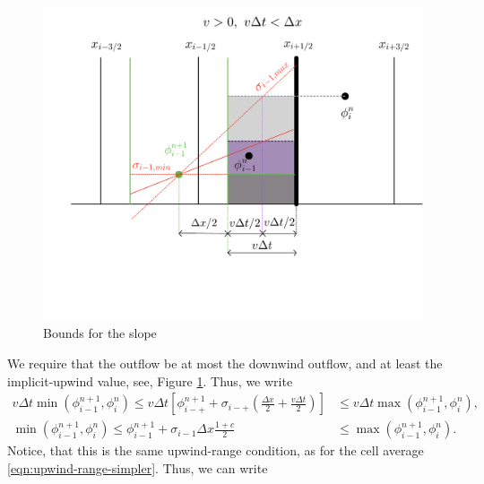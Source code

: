 \documentclass[../thesis.tex]{subfiles}
\begin{document}
\begin{figure}[H]
	\centering
	\includegraphics[width=\textwidth]{Slope-bounds-crop.pdf}
	\caption{Bounds for the slope}
	\label{fig:slope-bounds-implicit-1d}
\end{figure}
We require that the outflow be at most the downwind outflow, and at least the implicit-upwind value, see, Figure \ref{fig:slope-bounds-implicit-1d}. Thus, we write
\begin{equation}\label{eqn: urc-all c-bounded slope}
    \begin{split}
        v\Delta t\min(\phi_{i-1}^{n+1},\phi_{i}^{n})
        \leq
        v\Delta t
        \left[
            \phi_{i-+}^{n+1}
            +\sigma_{i-+}\left(
                \frac{\Delta x}{2} + \frac{v\Delta t}{2}
                \right)
        \right]
        &\leq
        v\Delta t\max(\phi_{i-1}^{n+1},\phi_{i}^{n}),
        \\
        \min(\phi_{i-1}^{n+1},\phi_{i}^{n})
        \leq
        \phi_{i-1}^{n+1}
        +\sigma_{i-1} \Delta x \frac{1+c}{2}
        &\leq
        \max(\phi_{i-1}^{n+1},\phi_{i}^{n}).
    \end{split}
\end{equation}
Notice, that this is the same upwind-range condition, as for the cell average \eqref{eqn:upwind-range-simpler}. Thus, we can write
\end{document}

